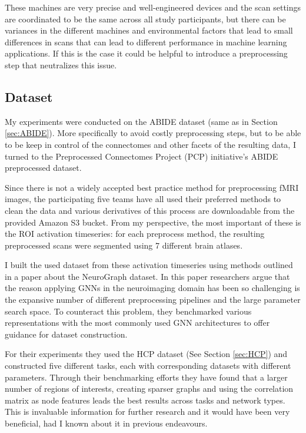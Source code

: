 	These machines are very precise and well-engineered devices and the scan settings are coordinated to be the same across all study participants, but there can be variances in the different machines and environmental factors that lead to small differences in scans\cite{sutton2008investigation} that can lead to different performance in machine learning applications. If this is the case it could be helpful to introduce a preprocessing step that neutralizes this issue.

	\subsection{Dataset}
	
	My experiments were conducted on the ABIDE dataset\cite{di2014autism} (same as in Section \ref{sec:ABIDE}). More specifically to avoid costly preprocessing steps, but to be able to be keep in control of the connectomes and other facets of the resulting data, I turned to the Preprocessed Connectomes Project (PCP) initiative's ABIDE preprocessed dataset\cite{craddock2013neuro}.
	
	Since there is not a widely accepted best practice method for preprocessing fMRI images, the participating five teams have all used their preferred methods to clean the data and various derivatives of this process are downloadable from the provided Amazon S3 bucket. From my perspective, the most important of these is the ROI activation timeseries: for each preprocess method, the resulting preprocessed scans were segmented using 7 different brain atlases. 
	
	I built the used dataset from these activation timeseries using methods outlined in a paper about the NeuroGraph dataset\cite{said2023neurograph}. In this paper researchers argue that the reason applying GNNs in the neuroimaging domain has been so challenging is the expansive number of different preprocessing pipelines and the large parameter search space. To counteract this problem, they benchmarked various representations with the most commonly used GNN architectures to offer guidance for dataset construction.
	
	For their experiments they used the HCP dataset (See Section \ref{sec:HCP}) and constructed five different tasks, each with corresponding datasets with different parameters. Through their benchmarking efforts they have found that a larger number of regions of interests, creating sparser graphs and using the correlation matrix as node features leads the best results across tasks and network types. This is invaluable information for further research and it would have been very beneficial, had I known about it in previous endeavours.
	
